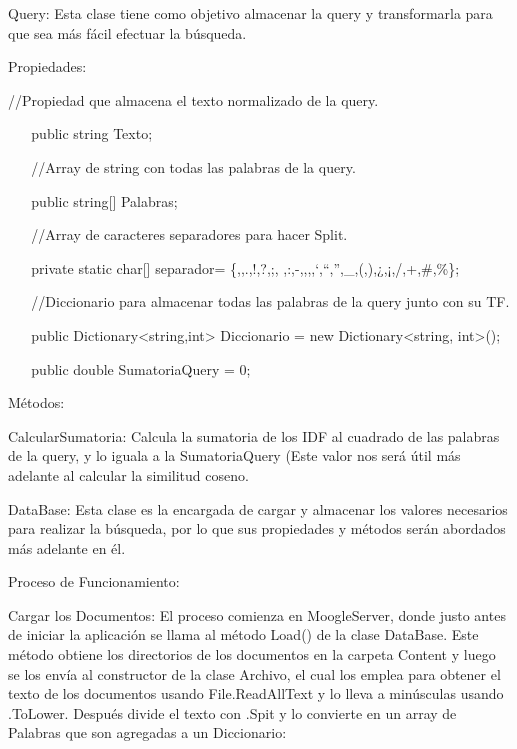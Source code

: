 \documentclass[
]{article}
\begin{document}
Query: Esta clase tiene como objetivo almacenar la query y transformarla
para que sea más fácil efectuar la búsqueda.

Propiedades:

//Propiedad que almacena el texto normalizado de la query.

~ ~ public string Texto;

~ ~ //Array de string con todas las palabras de la query.

~ ~ public string{[}{]} Palabras;

~ ~ //Array de caracteres separadores para hacer Split.

~ ~ private static char{[}{]} separador=
\{\textquotesingle,\textquotesingle,\textquotesingle.\textquotesingle,\textquotesingle!\textquotesingle,\textquotesingle?\textquotesingle,\textquotesingle;\textquotesingle,\textquotesingle{}
\textquotesingle,\textquotesingle:\textquotesingle,\textquotesingle-\textquotesingle,\textquotesingle*\textquotesingle,\textquotesingle{[}\textquotesingle,\textquotesingle{]}\textquotesingle,\textquotesingle`\textquotesingle,\textquotesingle``\textquotesingle,\textquotesingle''\textquotesingle,\textquotesingle\_\textquotesingle,\textquotesingle(\textquotesingle,\textquotesingle)\textquotesingle,\textquotesingle¿\textquotesingle,\textquotesingle¡\textquotesingle,\textquotesingle/\textquotesingle,\textquotesingle+\textquotesingle,\textquotesingle\#\textquotesingle,\textquotesingle\%\textquotesingle\};

~ ~ //Diccionario para almacenar todas las palabras de la query junto
con su TF.

~ ~ public Dictionary\textless string,int\textgreater{} Diccionario =
new Dictionary\textless string, int\textgreater();

~ ~ public double SumatoriaQuery = 0;

Métodos:

CalcularSumatoria: Calcula la sumatoria de los IDF al cuadrado de las
palabras de la query, y lo iguala a la SumatoriaQuery (Este valor nos
será útil más adelante al calcular la similitud coseno.

DataBase: Esta clase es la encargada de cargar y almacenar los valores
necesarios para realizar la búsqueda, por lo que sus propiedades y
métodos serán abordados más adelante en él.

Proceso de Funcionamiento:

Cargar los Documentos: El proceso comienza en MoogleServer, donde justo
antes de iniciar la aplicación se llama al método Load() de la clase
DataBase. Este método obtiene los directorios de los documentos en la
carpeta Content y luego se los envía al constructor de la clase Archivo,
el cual los emplea para obtener el texto de los documentos usando
File.ReadAllText y lo lleva a minúsculas usando .ToLower. Después divide
el texto con .Spit y lo convierte en un array de Palabras que son
agregadas a un Diccionario:
\end{document}
